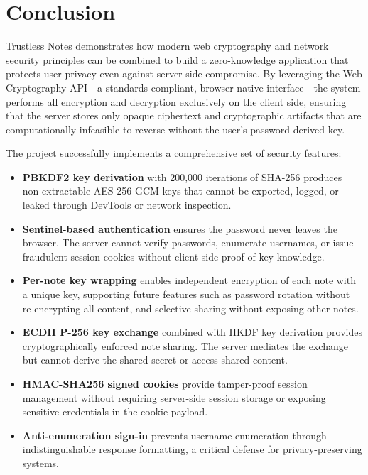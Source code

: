 
\chapter{Conclusion}

Trustless Notes demonstrates how modern web cryptography and network security principles can be combined to build a zero-knowledge application that protects user privacy even against server-side compromise. By leveraging the Web Cryptography API---a standards-compliant, browser-native interface---the system performs all encryption and decryption exclusively on the client side, ensuring that the server stores only opaque ciphertext and cryptographic artifacts that are computationally infeasible to reverse without the user's password-derived key.

The project successfully implements a comprehensive set of security features:

\begin{itemize}
    \item \textbf{PBKDF2 key derivation} with 200,000 iterations of SHA-256 produces non-extractable AES-256-GCM keys that cannot be exported, logged, or leaked through DevTools or network inspection.

    \item \textbf{Sentinel-based authentication} ensures the password never leaves the browser. The server cannot verify passwords, enumerate usernames, or issue fraudulent session cookies without client-side proof of key knowledge.

    \item \textbf{Per-note key wrapping} enables independent encryption of each note with a unique key, supporting future features such as password rotation without re-encrypting all content, and selective sharing without exposing other notes.

    \item \textbf{ECDH P-256 key exchange} combined with HKDF key derivation provides cryptographically enforced note sharing. The server mediates the exchange but cannot derive the shared secret or access shared content.

    \item \textbf{HMAC-SHA256 signed cookies} provide tamper-proof session management without requiring server-side session storage or exposing sensitive credentials in the cookie payload.

    \item \textbf{Anti-enumeration sign-in} prevents username enumeration through indistinguishable response formatting, a critical defense for privacy-preserving systems.
\end{itemize}

